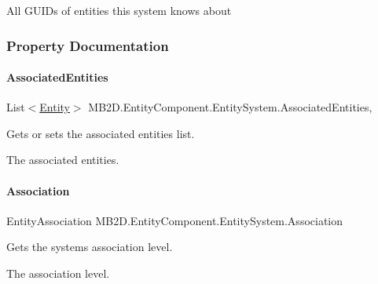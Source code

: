 All G\+U\+ID\textquotesingle{}s of entities this system knows about 



\subsubsection{Property Documentation}
\hypertarget{class_m_b2_d_1_1_entity_component_1_1_entity_system_a1c442059af272594b0485832c9f44e94}{}\label{class_m_b2_d_1_1_entity_component_1_1_entity_system_a1c442059af272594b0485832c9f44e94} 
\paragraph{\texorpdfstring{Associated\+Entities}{AssociatedEntities}}
{\footnotesize\ttfamily List$<$\hyperlink{class_m_b2_d_1_1_entity_component_1_1_entity}{Entity}$>$ M\+B2\+D.\+Entity\+Component.\+Entity\+System.\+Associated\+Entities\hspace{0.3cm}{\ttfamily [get]}, {\ttfamily [set]}}



Gets or sets the associated entities list. 

The associated entities.\hypertarget{class_m_b2_d_1_1_entity_component_1_1_entity_system_af68858392489a7aab3c91122ab48865f}{}\label{class_m_b2_d_1_1_entity_component_1_1_entity_system_af68858392489a7aab3c91122ab48865f} 
\paragraph{\texorpdfstring{Association}{Association}}
{\footnotesize\ttfamily Entity\+Association M\+B2\+D.\+Entity\+Component.\+Entity\+System.\+Association\hspace{0.3cm}{\ttfamily [get]}}



Gets the systems association level. 

The association level.\hypertarget{class_m_b2_d_1_1_entity_component_1_1_entity_system_a9da3b207e098aa5fcc6ceb2aa3d247d8}{}\label{class_m_b2_d_1_1_entity_component_1_1_entity_system_a9da3b207e098aa5fcc6ceb2aa3d247d8} 
